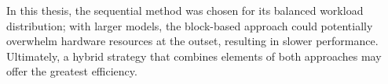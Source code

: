 In this thesis, the sequential method was chosen for its balanced workload distribution; with larger models, the block-based approach could potentially overwhelm hardware resources at the outset, resulting in slower performance. Ultimately, a hybrid strategy that combines elements of both approaches may offer the greatest efficiency.